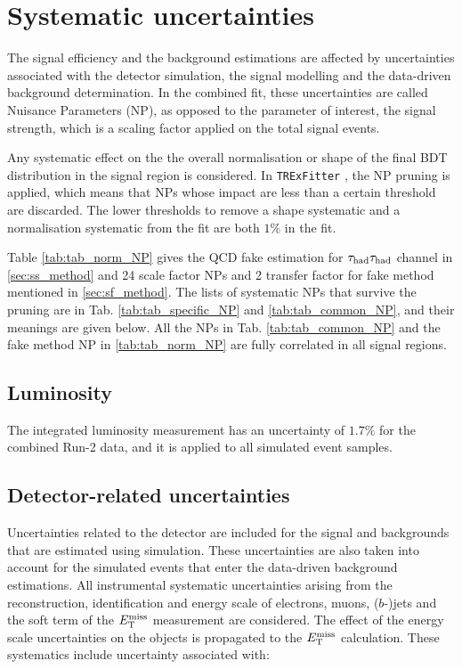 \section{Systematic uncertainties}
\label{sec:systematics}
The signal efficiency and the background estimations are affected by uncertainties associated with the detector simulation, the signal modelling and the data-driven background determination. In the combined fit, these uncertainties are called Nuisance Parameters (NP), as opposed to the parameter of interest, the signal strength, which is a scaling factor applied on the total signal events.

Any systematic effect on the the overall normalisation or shape of the final BDT distribution in the signal region is considered. In \texttt{TRExFitter} \cite{TRExFitter}, the NP pruning is applied, which means that NPs whose impact are less than a certain threshold are discarded. The lower thresholds to remove a shape systematic and a normalisation systematic from the fit are both $1\%$ in the fit.

Table \ref{tab:tab_norm_NP} gives the QCD fake estimation for $\tau_\text{had}{}\tau_\text{had}$ channel in \ref{sec:ss_method} and 24 scale factor NPs and 2 transfer factor for fake method mentioned in \ref{sec:sf_method}.
The lists of systematic NPs that survive the pruning are in Tab. \ref{tab:tab_specific_NP} and \ref{tab:tab_common_NP}, and their meanings are given below. All the NPs in Tab. \ref{tab:tab_common_NP} and the fake method NP in \ref{tab:tab_norm_NP} are fully correlated in all signal regions.



\subsection{Luminosity}
\label{sec:systematic_Luminosity}
The integrated luminosity measurement has an uncertainty of $1.7\%$ for the combined Run-2 data, and it is applied to all simulated event samples.

\subsection{Detector-related uncertainties}
\label{sec:syst_det}

Uncertainties related to the detector are included for the signal and backgrounds that are estimated using simulation. These uncertainties are also taken into account for the simulated events that enter the data-driven background estimations. All instrumental systematic uncertainties arising from the reconstruction, identification and energy scale of electrons, muons, ($b$-)jets and the soft term of the $E_{\text{T}}^{\text{miss}}$ measurement are considered. The effect of the energy scale uncertainties on the objects is propagated to the $E_{\text{T}}^{\text{miss}}$ calculation. These systematics include uncertainty associated with:

